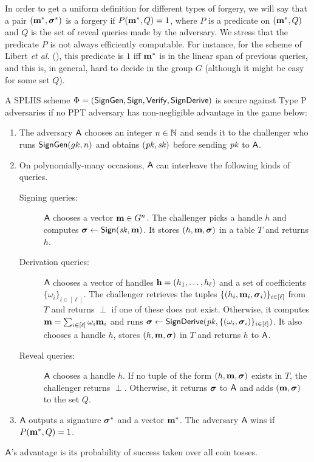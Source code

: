 \label{splhs-unforgeability}

In order to get a uniform definition for different types of forgery, we will say that a pair
$(\mathbf{m}^*,{\boldsymbol \sigma}^*)$ is a forgery if $P(\mathbf{m}^*, Q)=1$, where
$P$ is a predicate on $(\mathbf{m}^*, Q)$ and $Q$ is the set of reveal queries
made by the adversary. We stress that the predicate $P$ is not always efficiently computable. For instance, for the scheme of Libert \textit{et al.} (\cite{C:LPJY13}), this predicate is $1$ iff $\mathbf{m}^*$ is in the linear span of 
previous queries, and this is, in general, hard to decide in the group $G$ (although it might be easy for some set $Q$).  

\begin{definition} A SPLHS scheme $\Phi = (\mathsf{SignGen}, \mathsf{Sign}, \mathsf{Verify}, \mathsf{SignDerive})$ is secure against Type P adversaries if no PPT
adversary has non-negligible advantage in the game below:
\begin{enumerate}
\item The adversary $\mathsf{A}$ chooses an integer $n \in \mathbb{N}$ and sends it to the challenger who runs
$\mathsf{SignGen}(gk, n)$
and obtains $(\mathit{pk},\mathit{sk})$ before sending $\mathit{pk}$ to $\mathsf{A}$.
\item On polynomially-many occasions, $\mathsf{A}$ can interleave the following kinds of queries.
\begin{description}

\item[Signing queries:] $\mathsf{A}$ chooses a vector $\mathbf{m}\in G^n$.
The challenger picks a handle
$h$ and computes ${\boldsymbol \sigma}\gets\mathsf{Sign}(\mathit{sk}, \mathbf{m})$. It stores $(h,\mathbf{m}, {\boldsymbol \sigma})$
in a table $T$ and returns $h$.

\item[Derivation queries:] $\mathsf{A}$ chooses a vector of handles $\mathbf{h} = (h_1, \ldots , h_\ell)$ and a set of coefficients
$\{\omega_i\}_{i\in[\ell]}$. The challenger retrieves the tuples $\{(h_i,\mathbf{m}_i, {\boldsymbol \sigma}_i)\}_{i\in[\ell]}$
from $T$ and returns $\perp$ if one
of these does not exist. Otherwise, it computes
$\mathbf{m} = \sum_{i\in[\ell]} \omega_i\mathbf{m}_i$ and runs
${\boldsymbol \sigma}\gets\mathsf{SignDerive}(\mathit{pk},\{(\omega_i,{\boldsymbol \sigma}_i)\}_{i\in[\ell]})$.
It also chooses a handle $h$, stores $(h,\mathbf{m}, {\boldsymbol \sigma})$ in $T$ and returns $h$
to $\mathsf{A}$.

\item[Reveal queries:] $\mathsf{A}$ chooses a handle $h$. If no tuple of the form $(h,\mathbf{m},{\boldsymbol \sigma})$
exists in $T$, the challenger returns $\perp$. Otherwise, it returns ${\boldsymbol \sigma}$
to $\mathsf{A}$ and adds $(\mathbf{m}, {\boldsymbol \sigma})$ to the set $Q$.
\end{description}

\item $\mathsf{A}$ outputs a signature ${\boldsymbol \sigma}^*$ and a vector $\mathbf{m}^*$.
The adversary $\mathsf{A}$ wins if $P(\mathbf{m}^*,Q)=1$.
\end{enumerate}
$\mathsf{A}$’s advantage is its probability of success taken over all coin tosses.
\end{definition}

